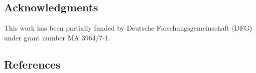 \subsection{Acknowledgments} 
This work has been partially funded by Deutsche Forschungsgemeinschaft (DFG) under grant number MA 3964/7-1. \\
\subsection{References} 


